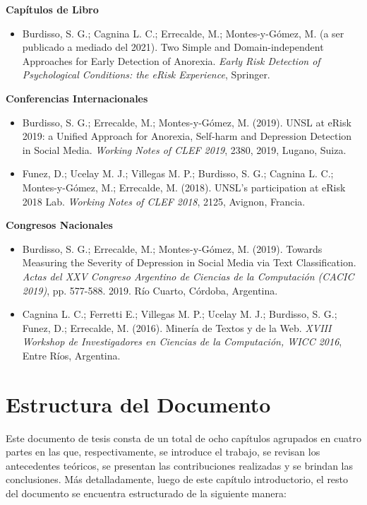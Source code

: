 \noindent
\textbf{Capítulos de Libro}

\begin{itemize}
    \item Burdisso, S. G.; Cagnina L. C.; Errecalde, M.; Montes-y-Gómez, M. (a ser publicado a mediado del 2021). Two Simple and Domain-independent Approaches for Early Detection of Anorexia. \emph{Early Risk Detection of Psychological Conditions: the eRisk Experience}, Springer.
\end{itemize}

\noindent
\textbf{Conferencias Internacionales}

\begin{itemize}
    \item Burdisso, S. G.; Errecalde, M.; Montes-y-Gómez, M. (2019). UNSL at eRisk 2019: a Unified Approach for Anorexia, Self-harm and Depression Detection in Social Media.  \emph{Working Notes of CLEF 2019}, 2380, 2019, Lugano, Suiza.
    \item Funez, D.; Ucelay M. J.; Villegas M. P.; Burdisso, S. G.; Cagnina L. C.;  Montes-y-Gómez, M.; Errecalde, M. (2018). UNSL's participation at eRisk 2018 Lab. \emph{Working Notes of CLEF 2018}, 2125, Avignon, Francia.
\end{itemize}

\noindent
\textbf{Congresos Nacionales}

\begin{itemize}
    \item Burdisso, S. G.; Errecalde, M.; Montes-y-Gómez, M. (2019).
    Towards Measuring the Severity of Depression in Social Media via Text Classification. \emph{Actas del XXV Congreso Argentino de Ciencias de la Computación (CACIC 2019)}, pp. 577-588. 2019. Río Cuarto, Córdoba, Argentina.
    \item Cagnina L. C.; Ferretti E.; Villegas M. P.; Ucelay M. J.; Burdisso, S. G.; Funez, D.; Errecalde, M. (2016). Minería de Textos y de la Web. \emph{XVIII Workshop de Investigadores en Ciencias de la Computación, WICC 2016}, Entre Ríos, Argentina.
\end{itemize}


\section{Estructura del Documento}

Este documento de tesis consta de un total de ocho capítulos agrupados en cuatro partes en las que, respectivamente, se introduce el trabajo, se revisan los antecedentes teóricos, se presentan las contribuciones realizadas y se brindan las conclusiones. Más detalladamente, luego de este capítulo introductorio, el resto del documento se encuentra estructurado de la siguiente manera:

